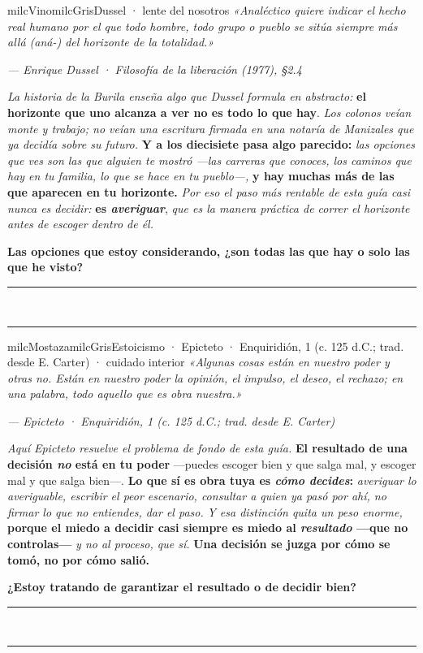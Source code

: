 \documentclass[11pt,letterpaper]{article}
\newcommand{\linead}[1]{\noindent\color{milcLinea}\rule{#1}{0.5pt}\color{milcNegro}}
\begin{document}
\begin{softbox}{milcVino}{milcGris}{Dussel · lente del nosotros}
\textit{«Analéctico quiere indicar el hecho real humano por el que todo hombre, todo grupo o pueblo se sitúa siempre más allá (aná-) del horizonte de la totalidad.»}

{\footnotesize\itshape\color{milcNegro!70}--- Enrique Dussel · Filosofía de la liberación (1977), §2.4}

\emph{La historia de la Burila enseña algo que Dussel formula en abstracto:} \textbf{el horizonte que uno alcanza a ver no es todo lo que hay}. \emph{Los colonos veían monte y trabajo; no veían una escritura firmada en una notaría de Manizales que ya decidía sobre su futuro.} \textbf{Y a los diecisiete pasa algo parecido:} \emph{las opciones que ves son las que alguien te mostró ---las carreras que conoces, los caminos que hay en tu familia, lo que se hace en tu pueblo---,} \textbf{y hay muchas más de las que aparecen en tu horizonte.} \emph{Por eso el paso más rentable de esta guía casi nunca es decidir:} \textbf{es \emph{averiguar}}, \emph{que es la manera práctica de correr el horizonte antes de escoger dentro de él.}

\textbf{Las opciones que estoy considerando, ¿son todas las que hay o solo las que he visto?}
\end{softbox}
\linead{\linewidth}\\[1mm]
\linead{\linewidth}

\begin{softbox}{milcMostaza}{milcGris}{Estoicismo · Epicteto · Enquiridión, 1 (c. 125 d.C.; trad. desde E. Carter) · cuidado interior}
\textit{«Algunas cosas están en nuestro poder y otras no. Están en nuestro poder la opinión, el impulso, el deseo, el rechazo; en una palabra, todo aquello que es obra nuestra.»}

{\footnotesize\itshape\color{milcNegro!70}--- Epicteto · Enquiridión, 1 (c. 125 d.C.; trad. desde E. Carter)}

\emph{Aquí Epicteto resuelve el problema de fondo de esta guía.} \textbf{El resultado de una decisión \emph{no} está en tu poder} ---puedes escoger bien y que salga mal, y escoger mal y que salga bien---. \textbf{Lo que sí es obra tuya es \emph{cómo decides}:} \emph{averiguar lo averiguable, escribir el peor escenario, consultar a quien ya pasó por ahí, no firmar lo que no entiendes, dar el paso.} \emph{Y esa distinción quita un peso enorme,} \textbf{porque el miedo a decidir casi siempre es miedo al \emph{resultado} ---que no controlas---} \emph{y no al proceso, que sí.} \textbf{Una decisión se juzga por cómo se tomó, no por cómo salió.}

\textbf{¿Estoy tratando de garantizar el resultado o de decidir bien?}
\end{softbox}
\linead{\linewidth}\\[1mm]
\linead{\linewidth}
\end{document}
